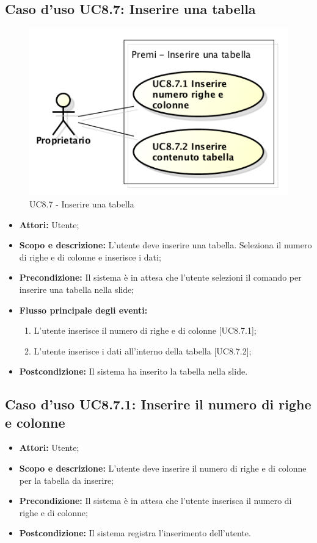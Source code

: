 \subsection{Caso d'uso UC8.7: Inserire una tabella}
\begin{figure}[h] 
	\centering 
	\includegraphics[scale=0.45] {img/UC8.7.png} 
	\caption{UC8.7 - Inserire una tabella} 
\end{figure}

\begin{itemize}
	\item \textbf{Attori:} Utente;
	\item \textbf{Scopo e descrizione:} L'utente deve inserire una tabella. Seleziona il numero di righe e di colonne e inserisce i dati;
	\item \textbf{Precondizione:} Il sistema è in attesa che l'utente selezioni il comando per inserire una tabella nella slide;
	\item \textbf{Flusso principale degli eventi:}
	\begin{enumerate}
		\item L'utente inserisce il numero di righe e di colonne [UC8.7.1];
		\item L'utente inserisce i dati all'interno della tabella [UC8.7.2];
	\end{enumerate}
	\item \textbf{Postcondizione:} Il sistema ha inserito la tabella nella slide.
\end{itemize}

	\subsection{Caso d'uso UC8.7.1: Inserire il numero di righe e colonne}
	\begin{itemize}
		\item \textbf{Attori:} Utente;
		\item \textbf{Scopo e descrizione:} L'utente deve inserire il numero di righe e di colonne per la tabella da inserire;
		\item \textbf{Precondizione:} Il sistema è in attesa che l'utente inserisca il numero di righe e di colonne;
		\item \textbf{Postcondizione:} Il sistema registra l'inserimento dell'utente.
	\end{itemize}
	
